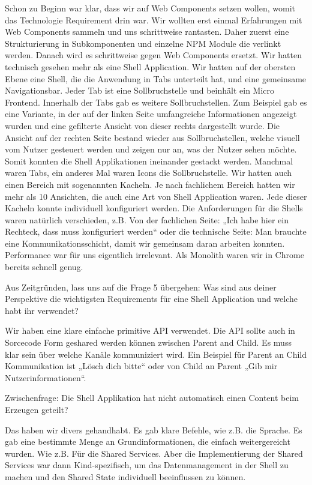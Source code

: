 \begin{description}
    \BerndOlleck Schon zu Beginn war klar, dass wir auf Web Components setzen wollen, womit das Technologie Requirement drin war. Wir wollten erst einmal Erfahrungen mit Web Components sammeln und uns schrittweise rantasten. Daher zuerst eine Strukturierung in Subkomponenten und einzelne NPM Module die verlinkt werden. Danach wird es schrittweise gegen Web Components ersetzt. Wir hatten technisch gesehen mehr als eine Shell Application. Wir hatten auf der obersten Ebene eine Shell, die die Anwendung in Tabs unterteilt hat, und eine gemeinsame Navigationsbar. Jeder Tab ist eine Sollbruchstelle und beinhält ein Micro Frontend. Innerhalb der Tabs gab es weitere Sollbruchstellen.
    Zum Beispiel gab es eine Variante, in der auf der linken Seite umfangreiche Informationen angezeigt wurden und eine gefilterte Ansicht von dieser rechts dargestellt wurde. Die Ansicht auf der rechten Seite bestand wieder aus Sollbruchstellen, welche visuell vom Nutzer gesteuert werden und zeigen nur an, was der Nutzer sehen möchte. Somit konnten die Shell Applikationen ineinander gestackt werden. Manchmal waren Tabs, ein anderes Mal waren Icons die Sollbruchstelle. Wir hatten auch einen Bereich mit sogenannten Kacheln. Je nach fachlichem Bereich hatten wir mehr als 10 Ansichten, die auch eine Art von Shell Application waren. Jede dieser Kacheln konnte individuell konfiguriert werden. Die Anforderungen für die Shells waren natürlich verschieden, z.B. Von der fachlichen Seite: „Ich habe hier ein Rechteck, dass muss konfiguriert werden“ oder die technische Seite: Man brauchte eine Kommunikationsschicht, damit wir gemeinsam daran arbeiten konnten. Performance war für uns eigentlich irrelevant. Als Monolith waren wir in Chrome bereits schnell genug.

    \NicoVogel Aus Zeitgründen, lass uns auf die Frage 5 übergehen: Was sind aus deiner Perspektive die wichtigsten Requirements für eine Shell Application und welche habt ihr verwendet?

    \BerndOlleck Wir haben eine klare einfache primitive API verwendet. Die API sollte auch in Sorcecode Form geshared werden können zwischen Parent and Child. Es muss klar sein über welche Kanäle kommuniziert wird. Ein Beispiel für Parent an Child Kommunikation ist „Lösch dich bitte“ oder von Child an Parent „Gib mir Nutzerinformationen“.

    \NicoVogel Zwischenfrage: Die Shell Applikation hat nicht automatisch einen Content beim Erzeugen geteilt?

    \BerndOlleck Das haben wir divers gehandhabt. Es gab klare Befehle, wie z.B. die Sprache. Es gab eine bestimmte Menge an Grundinformationen, die einfach weitergereicht wurden. Wie z.B. Für die Shared Services. Aber die Implementierung der Shared Services war dann Kind-spezifisch, um das Datenmanagement in der Shell zu machen und den Shared State individuell beeinflussen zu können.


\end{description}

